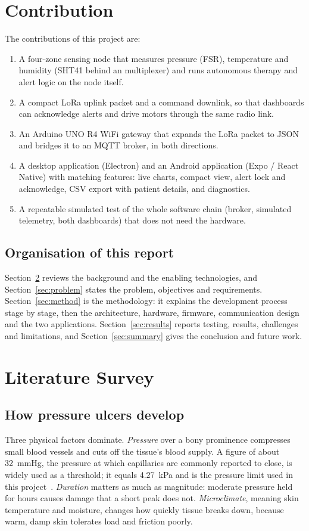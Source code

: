 \section{Contribution}
The contributions of this project are:
\begin{enumerate}
\item A four-zone sensing node that measures pressure (FSR), temperature and humidity (SHT41 behind an \itwoc{} multiplexer) and runs autonomous therapy and alert logic on the node itself.
\item A compact LoRa uplink packet and a command downlink, so that dashboards can acknowledge alerts and drive motors through the same radio link.
\item An Arduino UNO R4 WiFi gateway that expands the LoRa packet to JSON and bridges it to an MQTT broker, in both directions.
\item A desktop application (Electron) and an Android application (Expo / React Native) with matching features: live charts, compact view, alert lock and acknowledge, CSV export with patient details, and diagnostics.
\item A repeatable simulated test of the whole software chain (broker, simulated telemetry, both dashboards) that does not need the hardware.
\end{enumerate}

\subsection{Organisation of this report}
Section~\ref{sec:lit} reviews the background and the enabling technologies, and Section~\ref{sec:problem} states the problem, objectives and requirements. Section~\ref{sec:method} is the methodology: it explains the development process stage by stage, then the architecture, hardware, firmware, communication design and the two applications. Section~\ref{sec:results} reports testing, results, challenges and limitations, and Section~\ref{sec:summary} gives the conclusion and future work.

\clearpage
\section{Literature Survey}
\label{sec:lit}

\subsection{How pressure ulcers develop}
Three physical factors dominate. \emph{Pressure} over a bony prominence compresses small blood vessels and cuts off the tissue's blood supply. A figure of about 32~mmHg, the pressure at which capillaries are commonly reported to close, is widely used as a threshold; it equals 4.27~kPa and is the pressure limit used in this project~\cite{epuap2019}. \emph{Duration} matters as much as magnitude: moderate pressure held for hours causes damage that a short peak does not. \emph{Microclimate}, meaning skin temperature and moisture, changes how quickly tissue breaks down, because warm, damp skin tolerates load and friction poorly.

